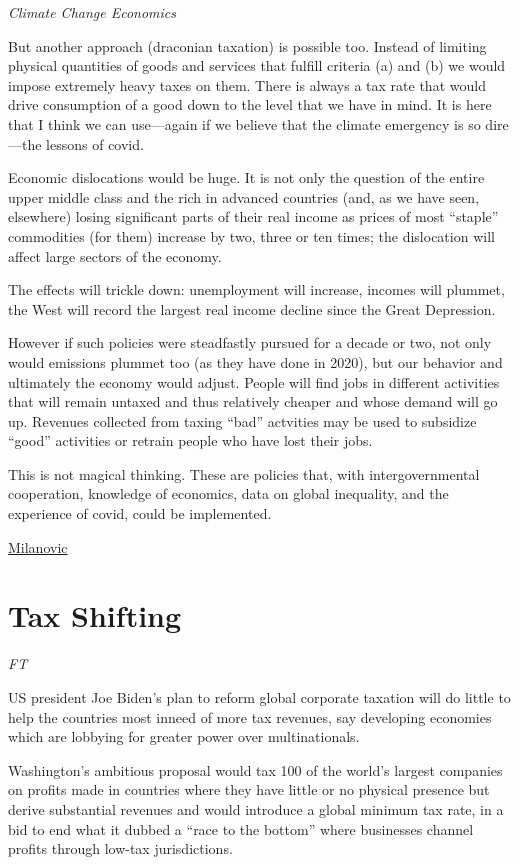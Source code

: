 \documentclass[
]{book}
\begin{document}
\emph{Climate Change Economics}

But another approach (draconian taxation) is possible too. Instead of limiting physical quantities of goods and services that fulfill criteria (a) and (b) we would impose extremely heavy taxes on them. There is always a tax rate that would drive consumption of a good down to the level that we have in mind. It is here that I think we can use---again if we believe that the climate emergency is so dire---the lessons of covid.

Economic dislocations would be huge. It is not only the question of the entire upper middle class and the rich in advanced countries (and, as we have seen, elsewhere) losing significant parts of their real income as prices of most ``staple'' commodities (for them) increase by two, three or ten times; the dislocation will affect large sectors of the economy.

The effects will trickle down: unemployment will increase, incomes will plummet, the West will record the largest real income decline since the Great Depression.

However if such policies were steadfastly pursued for a decade or two, not only would emissions plummet too (as they have done in 2020), but our behavior and ultimately the economy would adjust. People will find jobs in different activities that will remain untaxed and thus relatively cheaper and whose demand will go up. Revenues collected from taxing ``bad'' actvities may be used to subsidize ``good'' activities or retrain people who have lost their jobs.

This is not magical thinking. These are policies that, with intergovernmental cooperation, knowledge of economics, data on global inequality, and the experience of covid, could be implemented.

\href{http://glineq.blogspot.com/2021/02/climate-change-covid-and-global.html}{Milanovic}

\hypertarget{tax-shifting}{%
\section{Tax Shifting}\label{tax-shifting}}

\emph{FT}

US president Joe Biden's plan to reform global corporate taxation will do little to help the countries most inneed of more tax revenues, say developing economies which are lobbying for greater power over multinationals.

Washington's ambitious proposal would tax 100 of the world's largest companies on profits made in countries where they have little or no physical presence but derive substantial revenues and would introduce a global minimum tax rate, in a bid to end what it dubbed a ``race to the bottom'' where businesses channel profits through low-tax jurisdictions.
\end{document}

